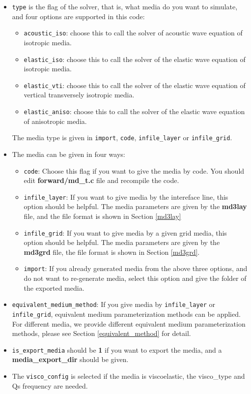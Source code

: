 \begin{itemize}
  \item \texttt{type} is the flag of the solver, that is, what media do you want to simulate, and four options are supported in this code:
  \begin{itemize}
    \item \texttt{acoustic\_iso}: choose this to call the solver of acoustic wave equation of isotropic media.  
    \item \texttt{elastic\_iso}: choose this to call the solver of the elastic wave equation of isotropic media.
    \item \texttt{elastic\_vti}: choose this to call the solver of the elastic wave equation of vertical transversely isotropic media. 
    \item \texttt{elastic\_aniso}: choose this to call the solver of the elastic wave equation of anisotropic media. 
  \end{itemize}
  The media type is given in \texttt{import}, \texttt{code}, \texttt{infile\_layer} or \texttt{infile\_grid}.

  \item The media can be given in four ways:
  \begin{itemize}  
    \item \texttt{code}: Choose this flag if you want to give the media by code. You should edit \textbf{forward/md\_t.c} file and recompile the code.
    \item \texttt{infile\_layer}: If you want to give media by the intereface line, this option should be helpful. The media parameters are given by the \textbf{md3lay} file, and the file format is shown in Section \ref{md3lay} 
    \item \texttt{infile\_grid}: If you want to give media by a given grid media, this option should be helpful. The media parameters are given by the \textbf{md3grd} file, the file format is shown in Section \ref{md3grd}.
    \item \texttt{import}: If you already generated media from the above three options, and do not want to re-generate media, select this option and give the folder of the exported media. 
  \end{itemize}

  \item \texttt{equivalent\_medium\_method}: If you give media by \texttt{infile\_layer} or \texttt{infile\_grid}, equivalent medium parameterization methods can be applied. For different media, we provide different equivalent medium parameterization methods, please see Section \ref{equivalent_method} for detail.
   
  \item \texttt{is\_export\_media} should be \textbf{1} if you want to export the media, and a \textbf{media\_export\_dir} should be given. 
  
  \item The \texttt{visco\_config} is selected if the media is viscoelastic, the visco\_type and Qs frequency are needed.

\end{itemize}

